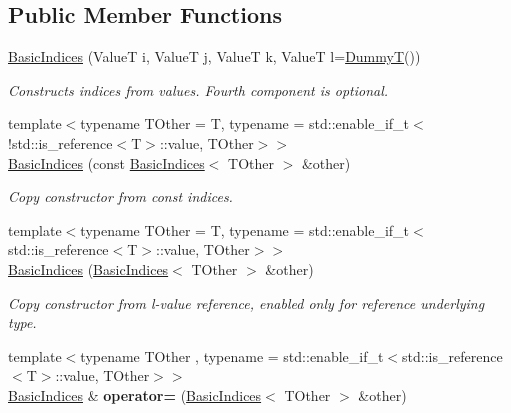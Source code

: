 \subsection*{Public Member Functions}
\begin{DoxyCompactItemize}
\item 
\hypertarget{classBasicIndices_a6a8c243116832f0238d8c1f1bf3add9e}{}\label{classBasicIndices_a6a8c243116832f0238d8c1f1bf3add9e} 
\hyperlink{classBasicIndices_a6a8c243116832f0238d8c1f1bf3add9e}{Basic\+Indices} (ValueT i, ValueT j, ValueT k, ValueT l=\hyperlink{classDummyReferenceMaker}{DummyT}())
\begin{DoxyCompactList}\small\item\em Constructs indices from values. Fourth component is optional. \end{DoxyCompactList}\item 
\hypertarget{classBasicIndices_ad717c49ee83f41609a3ffdb36375e1f8}{}\label{classBasicIndices_ad717c49ee83f41609a3ffdb36375e1f8} 
{\footnotesize template$<$typename T\+Other  = T, typename  = std\+::enable\+\_\+if\+\_\+t$<$!std\+::is\+\_\+reference$<$\+T$>$\+::value, T\+Other$>$$>$ }\\\hyperlink{classBasicIndices_ad717c49ee83f41609a3ffdb36375e1f8}{Basic\+Indices} (const \hyperlink{classBasicIndices}{Basic\+Indices}$<$ T\+Other $>$ \&other)
\begin{DoxyCompactList}\small\item\em Copy constructor from const indices. \end{DoxyCompactList}\item 
\hypertarget{classBasicIndices_ac75e8f4b9e0f1cb72612047d792c85c2}{}\label{classBasicIndices_ac75e8f4b9e0f1cb72612047d792c85c2} 
{\footnotesize template$<$typename T\+Other  = T, typename  = std\+::enable\+\_\+if\+\_\+t$<$std\+::is\+\_\+reference$<$\+T$>$\+::value, T\+Other$>$$>$ }\\\hyperlink{classBasicIndices_ac75e8f4b9e0f1cb72612047d792c85c2}{Basic\+Indices} (\hyperlink{classBasicIndices}{Basic\+Indices}$<$ T\+Other $>$ \&other)
\begin{DoxyCompactList}\small\item\em Copy constructor from l-\/value reference, enabled only for reference underlying type. \end{DoxyCompactList}\item 
\hypertarget{classBasicIndices_a196c3849d76701f87cfe9c5f08be80e4}{}\label{classBasicIndices_a196c3849d76701f87cfe9c5f08be80e4} 
{\footnotesize template$<$typename T\+Other , typename  = std\+::enable\+\_\+if\+\_\+t$<$std\+::is\+\_\+reference$<$\+T$>$\+::value, T\+Other$>$$>$ }\\\hyperlink{classBasicIndices}{Basic\+Indices} \& {\bfseries operator=} (\hyperlink{classBasicIndices}{Basic\+Indices}$<$ T\+Other $>$ \&other)

\end{DoxyCompactItemize}
